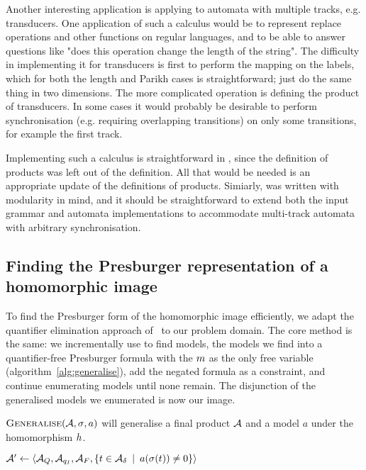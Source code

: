 \documentclass[acmsmall,review,anonymous,screen]{acmart}\settopmatter{printfolios=true,printccs=true,printacmref=true}
\theoremstyle{definition}
\begin{document}
Another interesting application is applying \Calculus{} to automata with
multiple tracks, e.g. transducers. One application of such a calculus would be
to represent replace operations and other functions on regular languages, and to
be able to answer questions like "does this operation change the length of the
string". The difficulty in implementing it for transducers is first to perform
the mapping on the labels, which for both the length and Parikh cases is
straightforward; just do the same thing in two dimensions. The more complicated
operation is defining the product of transducers. In some cases it would
probably be desirable to perform synchronisation (e.g. requiring overlapping
transitions) on only some transitions, for example the first track.

Implementing such a calculus is straightforward in \Calculus, since the
definition of products was left out of the definition. All that would be needed
is an appropriate update of the definitions of products. Simiarly, \Catra was
written with modularity in mind, and it should be straightforward to extend both
the input grammar and automata implementations to accommodate multi-track
automata with arbitrary synchronisation.

\subsection{Finding the Presburger representation of a homomorphic image}\label{sec:finding-the-image}

To find the Presburger form of the homomorphic image efficiently, we adapt the
quantifier elimination approach of~\cite{qe} to our problem domain. The core
method is the same: we incrementally use \Calculus{} to find models,
\Generalise{} the models we find into a quantifier-free Presburger formula with
the $m$ as the only free variable (algorithm~\ref{alg:generalise}), add the
negated formula as a constraint, and continue enumerating models until none
remain. The disjunction of the generalised models we enumerated is now our
image.

\begin{algorithm}
  \caption{$\textsc{Generalise}{}(\mathcal{A}, \operatorname{\sigma}, a)$ will generalise a final product $\mathcal{A}$ and a model $a$ under the homomorphism $h$.}\label{alg:generalise}

  $\mathcal{A}' \gets \left\langle\mathcal{A}_Q, \mathcal{A}_{q_I}, \mathcal{A}_F, \left\{t \in \mathcal{A}_\delta \:\mid\: a(\operatorname{\sigma}(t)) \neq 0\right\}\right\rangle$

  \end{algorithm}
\end{document}
